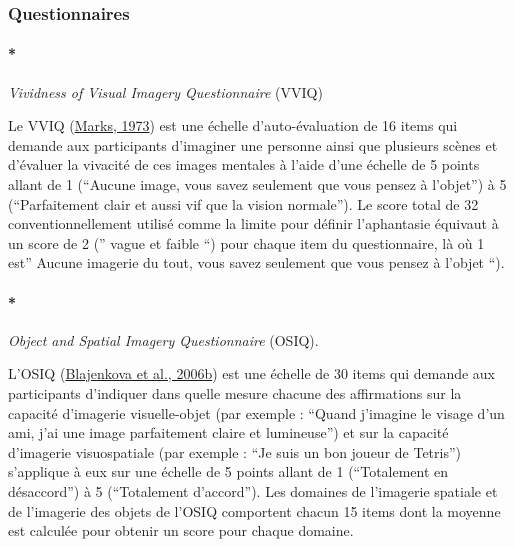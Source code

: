 \documentclass[
  12pt,
]{article}
\let\oldparagraph\paragraph
\renewcommand{\paragraph}[1]{\oldparagraph{#1}\mbox{}}
\begin{document}
\hypertarget{questionnaires}{%
\subsubsection{Questionnaires}\label{questionnaires}}

\hypertarget{vividness-of-visual-imagery-questionnaire-vviq}{%
\paragraph*{\texorpdfstring{\emph{Vividness of Visual Imagery
Questionnaire}
(VVIQ)}{Vividness of Visual Imagery Questionnaire (VVIQ)}}\label{vividness-of-visual-imagery-questionnaire-vviq}}

Le VVIQ (\protect\hyperlink{ref-marksVividnessVisualImagery1973}{Marks,
1973}) est une échelle d'auto-évaluation de 16 items qui demande aux
participants d'imaginer une personne ainsi que plusieurs scènes et
d'évaluer la vivacité de ces images mentales à l'aide d'une échelle de 5
points allant de 1 (``Aucune image, vous savez seulement que vous pensez
à l'objet'') à 5 (``Parfaitement clair et aussi vif que la vision
normale''). Le score total de 32 conventionnellement utilisé comme la
limite pour définir l'aphantasie équivaut à un score de 2 ('' vague et
faible ``) pour chaque item du questionnaire, là où 1 est'' Aucune
imagerie du tout, vous savez seulement que vous pensez à l'objet ``).

\hypertarget{object-and-spatial-imagery-questionnaire-osiq.}{%
\paragraph*{\texorpdfstring{\emph{Object and Spatial Imagery
Questionnaire}
(OSIQ).}{Object and Spatial Imagery Questionnaire (OSIQ).}}\label{object-and-spatial-imagery-questionnaire-osiq.}}

L'OSIQ
(\protect\hyperlink{ref-blajenkovaObjectspatialImageryNew2006}{Blajenkova
et al., 2006b}) est une échelle de 30 items qui demande aux participants
d'indiquer dans quelle mesure chacune des affirmations sur la capacité
d'imagerie visuelle-objet (par exemple : ``Quand j'imagine le visage
d'un ami, j'ai une image parfaitement claire et lumineuse'') et sur la
capacité d'imagerie visuospatiale (par exemple : ``Je suis un bon joueur
de Tetris'') s'applique à eux sur une échelle de 5 points allant de 1
(``Totalement en désaccord'') à 5 (``Totalement d'accord''). Les
domaines de l'imagerie spatiale et de l'imagerie des objets de l'OSIQ
comportent chacun 15 items dont la moyenne est calculée pour obtenir un
score pour chaque domaine.
\end{document}

